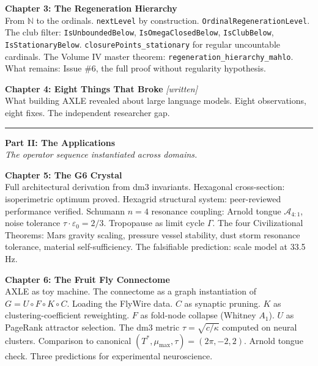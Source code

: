 \documentclass[12pt, oneside]{book}
\begin{document}
\medskip
\noindent\textbf{Chapter 3: The Regeneration Hierarchy}\\
From $\mathbb{N}$ to the ordinals. \texttt{nextLevel} by construction.
\texttt{OrdinalRegenerationLevel}. The club filter:
\texttt{IsUnboundedBelow}, \texttt{IsOmegaClosedBelow},
\texttt{IsClubBelow}, \texttt{IsStationaryBelow}.
\texttt{closurePoints\_stationary} for regular uncountable cardinals.
The Volume IV master theorem: \texttt{regeneration\_hierarchy\_mahlo}.
What remains: Issue \#6, the full proof without regularity hypothesis.

\medskip
\noindent\textbf{Chapter 4: Eight Things That Broke}
\textit{[written]}\\
What building AXLE revealed about large language models.
Eight observations, eight fixes. The independent researcher gap.

\vspace{0.5cm}
\hrule
\vspace{0.5cm}


\noindent\textbf{Part II: The Applications}\\
\textit{The operator sequence instantiated across domains.}

\medskip
\noindent\textbf{Chapter 5: The G6 Crystal}\\
Full architectural derivation from dm3 invariants.
Hexagonal cross-section: isoperimetric optimum proved.
Hexagrid structural system: peer-reviewed performance verified.
Schumann $n=4$ resonance coupling: Arnold tongue $\mathcal{A}_{4:1}$,
noise tolerance $\tau \cdot \varepsilon_0 = 2/3$.
Tropopause as limit cycle $\Gamma$.
The four Civilizational Theorems: Mars gravity scaling,
pressure vessel stability, dust storm resonance tolerance,
material self-sufficiency. The falsifiable prediction:
scale model at 33.5\,Hz.

\medskip
\noindent\textbf{Chapter 6: The Fruit Fly Connectome}\\
AXLE as toy machine. The connectome as a graph instantiation
of $G = U \circ F \circ K \circ C$. Loading the FlyWire data.
$C$ as synaptic pruning. $K$ as clustering-coefficient reweighting.
$F$ as fold-node collapse (Whitney $A_1$). $U$ as PageRank
attractor selection. The dm3 metric $\tau = \sqrt{c/\kappa}$
computed on neural clusters. Comparison to canonical
$(T^*, \mu_{\max}, \tau) = (2\pi, -2, 2)$. Arnold tongue check.
Three predictions for experimental neuroscience.
\end{document}
